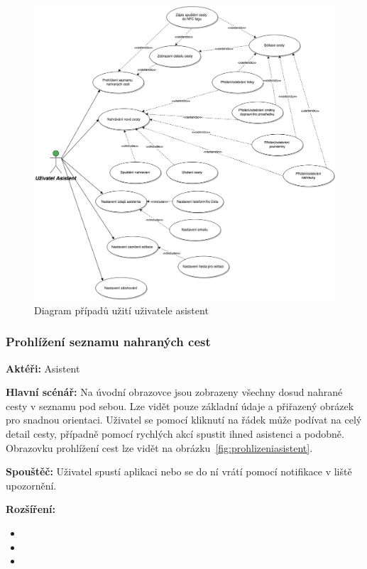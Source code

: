 \documentclass[czech,master,public,dept460,male,java,cpdeclaration]{diploma}
\newcommand{\usecase}[2]{\subsubsection{#1}\label{#2}}
\begin{document}
\begin{figure}[H]
        \centering
                \includegraphics[scale=0.2]{img/UseCasesAsistant.png}
        \caption{Diagram případů užití uživatele asistent}
        \label{fig:UseCasesAsistant}
\end{figure}

\usecase{Prohlížení seznamu nahraných cest}{prohlizeniasistent}
\textbf{Aktéři:} Asistent

\vspace{0.1cm}
\noindent
\textbf{Hlavní scénář:} Na úvodní obrazovce jsou zobrazeny všechny dosud nahrané cesty v seznamu pod sebou.
Lze vidět pouze základní údaje a přiřazený obrázek pro snadnou orientaci. Uživatel se pomocí
kliknutí na řádek může podívat na celý detail cesty, případně pomocí rychlých akcí spustit ihned asistenci
a podobně. Obrazovku prohlížení cest lze vidět na obrázku~\ref{fig:prohlizeniasistent}.

\vspace{0.1cm}
\noindent
\textbf{Spouštěč:} Uživatel spustí aplikaci nebo se do ní vrátí pomocí notifikace v liště upozornění.

\vspace{0.1cm}
\noindent
\textbf{Rozšíření:}
\begin{itemize}
  \item {}
  \item {}
  \item {}
\end{itemize}
\end{document}
